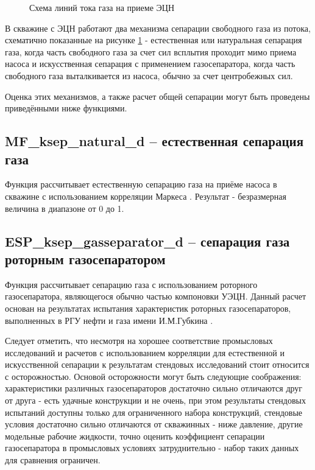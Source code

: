 \begin{figure}[h!]
	\begin{center}
		
		\caption{Схема линий тока газа на приеме ЭЦН}
		\label{ris:separation_scheme}
	\end{center}
\end{figure}

В скважине с ЭЦН работают два механизма сепарации свободного газа из потока, схематично показанные на рисунке \ref{ris:separation_scheme} - естественная или натуральная сепарация газа, когда часть свободного газа за счет сил всплытия проходит мимо приема насоса и искусственная сепарация с применением газосепаратора, когда часть свободного газа выталкивается из насоса, обычно за счет центробежных сил. 

Оценка этих механизмов, а также расчет общей сепарации могут быть проведены приведёнными ниже функциями.

\subsection{MF\_ksep\_natural\_d – естественная сепарация газа}
Функция рассчитывает естественную сепарацию газа на приёме насоса в скважине с использованием корреляции Маркеса \cite{Marquez_2003} . Результат - безразмерная величина в диапазоне от 0 до 1. 


\subsection{ESP\_ksep\_gasseparator\_d – сепарация газа роторным газосепаратором}
Функция рассчитывает сепарацию газа с использованием роторного газосепаратора, являющегося обычно частью компоновки УЭЦН. Данный расчет основан на результатах испытания характеристик роторных газосепараторов, выполненных в РГУ нефти и газа имени И.М.Губкина \cite{SPE_117415_2008}. 

Следует отметить, что несмотря на хорошее соответствие промысловых исследований и расчетов с использованием корреляции для естественной и искусственной сепарации \cite{SPE_117415_2008} к результатам стендовых исследований стоит относится с осторожностью. Основой осторожности могут быть следующие соображения: характеристики различных газосепараторов достаточно сильно отличаются друг от друга - есть удачные конструкции и не очень, при этом результаты стендовых испытаний доступны только для ограниченного набора конструкций, стендовые условия достаточно сильно отличаются от скважинных - ниже давление, другие модельные рабочие жидкости, точно оценить коэффициент сепарации газосепаратора в промысловых условиях затруднительно - набор таких данных для сравнения ограничен. 

